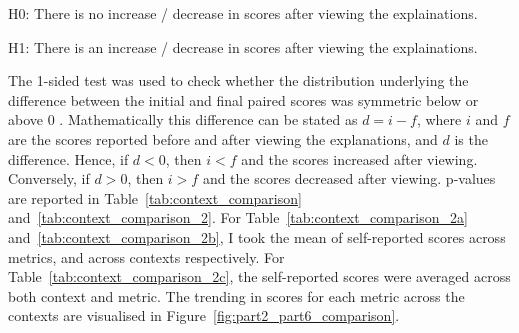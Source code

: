 \noindent H0: There is no increase / decrease in scores after viewing the explainations.

\noindent H1: There is an increase / decrease in scores after viewing the explainations.

The 1-sided test was used to check whether the distribution underlying the difference between the initial and final paired scores was symmetric below or above 0 \cite{scipy}. Mathematically this difference can be stated as $d = i - f$, where $i$ and $f$ are the scores reported before and after viewing the explanations, and $d$ is the difference. Hence, if $d < 0$, then $i < f$ and the scores increased after viewing. Conversely, if $d > 0$, then $i > f$ and the scores decreased after viewing. p-values are reported in Table~\ref{tab:context_comparison} and~\ref{tab:context_comparison_2}. For Table~\ref{tab:context_comparison_2a} and~\ref{tab:context_comparison_2b}, I took the mean of self-reported scores across metrics, and across contexts respectively. For Table~\ref{tab:context_comparison_2c}, the self-reported scores were averaged across both context and metric. The trending in scores for each metric across the contexts are visualised in Figure~\ref{fig:part2_part6_comparison}.

\begin{table}[!ht]
    \centering
    \caption{p-values comparing whether there was a statistically significant increase / decrease in the explainability scores before and after viewing explanations.}
    \label{tab:context_comparison}
\end{table}

